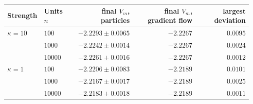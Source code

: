 \begin{tabular}{llrrr}
\toprule
Strength & Units $n$ & final $V_m$, particles & final $V_m$, gradient flow & largest deviation \\
\midrule
$\kappa=10$ & $100$ & $-2.2293\pm0.0065$ & $-2.2267$ & $0.0095$ \\
 & $1000$ & $-2.2242\pm0.0014$ & $-2.2267$ & $0.0024$ \\
 & $10000$ & $-2.2261\pm0.0016$ & $-2.2267$ & $0.0012$ \\
$\kappa=1$ & $100$ & $-2.2206\pm0.0083$ & $-2.2189$ & $0.0101$ \\
 & $1000$ & $-2.2167\pm0.0017$ & $-2.2189$ & $0.0025$ \\
 & $10000$ & $-2.2183\pm0.0018$ & $-2.2189$ & $0.0011$ \\
\bottomrule
\end{tabular}
